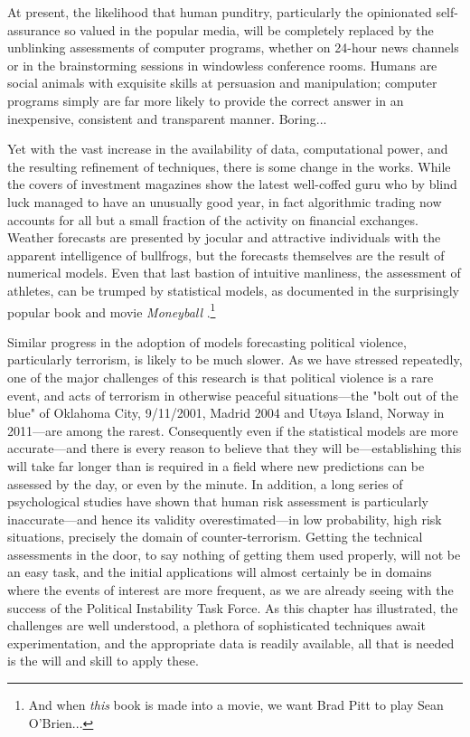 \documentclass[graybox]{svmult}
\begin{document}
At present, the likelihood that human punditry, particularly the opinionated self-assurance so valued in the popular media, will be completely replaced by the unblinking assessments of computer programs, whether on 24-hour news channels or in the brainstorming sessions in windowless conference rooms. Humans are social animals with exquisite skills at persuasion and manipulation; computer programs simply are far more likely to provide the correct answer in an inexpensive, consistent and transparent manner. Boring...

Yet with the vast increase in the availability of data, computational power, and the resulting refinement of techniques, there is some change in the works. While the covers of investment magazines show the latest well-coffed guru who by blind luck managed to have an unusually good year, in fact algorithmic trading now accounts for all but a small fraction of the activity on financial exchanges. Weather forecasts are presented by jocular and attractive individuals with the apparent intelligence of bullfrogs, but the forecasts themselves are the result of numerical models. Even that last bastion of intuitive manliness, the assessment of athletes, can be trumped by statistical models, as documented in the surprisingly popular book and movie \textit{Moneyball} \cite{Lewis11}.\footnote{And when \textit{this} book is made into a movie, we want Brad Pitt to play Sean O'Brien...}

Similar progress in the adoption of models forecasting political violence, particularly terrorism, is likely to be much slower. As we have stressed repeatedly, one of the major challenges of this research is that political violence is a rare event, and acts of terrorism in otherwise peaceful situations---the "bolt out of the blue" of Oklahoma City, 9/11/2001, Madrid 2004 and Ut\o ya Island, Norway in 2011---are among the rarest. Consequently even if the statistical models are more accurate---and there is every reason to believe that they will be---establishing this will take far longer than is required in a field where new predictions can be assessed by the day, or even by the minute. In addition, a long series of psychological studies have shown that human risk assessment is particularly inaccurate---and hence its validity overestimated---in low probability, high risk situations, precisely the domain of counter-terrorism. Getting the technical assessments in the door, to say nothing of getting them used properly, will not be an easy task, and the initial applications will almost certainly be in domains where the events of interest are more frequent, as we are already seeing with the success of the Political Instability Task Force. As this chapter has illustrated, the challenges are well understood, a plethora of sophisticated techniques await experimentation, and the appropriate data is readily available, all that is needed is the will and skill to apply these.
\end{document}
